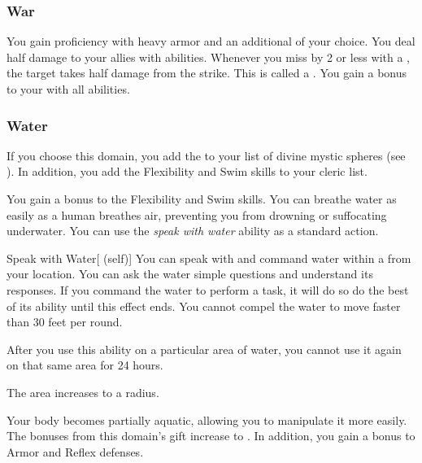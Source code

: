         \subsubsection{War}
             You gain proficiency with heavy armor and an additional  of your choice.
             You deal half damage to your allies with  abilities.
             Whenever you miss by 2 or less with a , the target takes half damage from the strike.
            This is called a .
             You gain a  bonus to your  with all abilities.

        \subsubsection{Water}
            If you choose this domain, you add the   to your list of divine mystic spheres (see ).
            In addition, you add the Flexibility and Swim skills to your cleric  list.

             You gain a  bonus to the Flexibility and Swim skills.
             You can breathe water as easily as a human breathes air, preventing you from drowning or suffocating underwater.
             You can use the \textit{speak with water} ability as a standard action.
            \begin{attuneability}{Speak with Water}[ (self)]
                You can speak with and command water within a \areahuge {} from your location.
                You can ask the water simple questions and understand its responses.
                If you command the water to perform a task, it will do so do the best of its ability until this effect ends.
                You cannot compel the water to move faster than 30 feet per round.

                After you use this ability on a particular area of water, you cannot use it again on that same area for 24 hours.

                \rankline
                 The area increases to a \areagarg radius.
            \end{attuneability}
             Your body becomes partially aquatic, allowing you to manipulate it more easily.
            The bonuses from this domain's gift increase to .
            In addition, you gain a  bonus to Armor and Reflex defenses.

